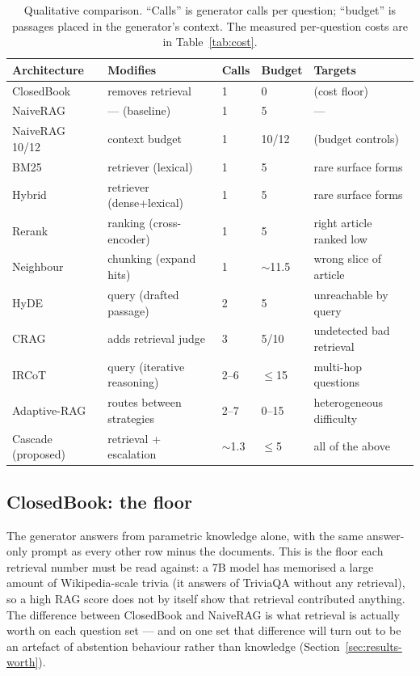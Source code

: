 \begin{table}[t]
\centering\small
\caption{Qualitative comparison. ``Calls'' is generator calls per question;
``budget'' is passages placed in the generator's context. The measured
per-question costs are in Table~\ref{tab:cost}.}
\label{tab:qualitative}
\begin{tabular}{lllll}
\toprule
Architecture & Modifies & Calls & Budget & Targets \\
\midrule
ClosedBook & removes retrieval & 1 & 0 & (cost floor) \\
NaiveRAG & --- (baseline) & 1 & 5 & --- \\
NaiveRAG 10/12 & context budget & 1 & 10/12 & (budget controls) \\
BM25 & retriever (lexical) & 1 & 5 & rare surface forms \\
Hybrid & retriever (dense+lexical) & 1 & 5 & rare surface forms \\
Rerank & ranking (cross-encoder) & 1 & 5 & right article ranked low \\
Neighbour & chunking (expand hits) & 1 & $\sim$11.5 & wrong slice of article \\
HyDE & query (drafted passage) & 2 & 5 & unreachable by query \\
CRAG & adds retrieval judge & 3 & 5/10 & undetected bad retrieval \\
IRCoT & query (iterative reasoning) & 2--6 & $\le$15 & multi-hop questions \\
Adaptive-RAG & routes between strategies & 2--7 & 0--15 & heterogeneous difficulty \\
\midrule
Cascade (proposed) & retrieval + escalation & $\sim$1.3 & $\le$5 & all of the above \\
\bottomrule
\end{tabular}
\end{table}

\subsection{ClosedBook: the floor}
\label{sec:arch-closedbook}

The generator answers from parametric knowledge alone, with the same
answer-only prompt as every other row minus the documents. This is the
floor each retrieval number must be read against: a 7B model has memorised
a large amount of Wikipedia-scale trivia (it answers
\ClosedBookTriviaQAEM{} of TriviaQA without any retrieval), so a high RAG
score does not by itself show that retrieval contributed anything. The
difference between ClosedBook and NaiveRAG is what retrieval is actually
worth on each question set --- and on one set that difference will turn
out to be an artefact of abstention behaviour rather than knowledge
(Section~\ref{sec:results-worth}).

